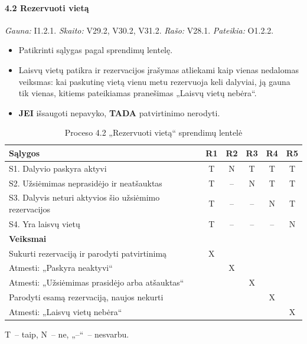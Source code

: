 \paragraph{4.2 Rezervuoti vietą}\mbox{}\par
{\small \textit{Gauna:} I1.2.1. \textit{Skaito:} V29.2, V30.2, V31.2. \textit{Rašo:} V28.1. \textit{Pateikia:} O1.2.2.}
\begin{itemize}
  \item Patikrinti sąlygas pagal sprendimų lentelę.
  \item Laisvų vietų patikra ir rezervacijos įrašymas atliekami kaip vienas nedalomas veiksmas: kai paskutinę vietą vienu metu rezervuoja keli dalyviai, ją gauna tik vienas, kitiems pateikiamas pranešimas „Laisvų vietų nebėra“.
  \item \textbf{JEI} išsaugoti nepavyko, \textbf{TADA} patvirtinimo nerodyti.
\end{itemize}
\begin{table}[H]
\centering
\caption{Proceso 4.2 „Rezervuoti vietą“ sprendimų lentelė}\label{tab:pspec-42}
\small
\begin{tabular}{@{}lccccc@{}}
\toprule
\textbf{Sąlygos} & \textbf{R1} & \textbf{R2} & \textbf{R3} & \textbf{R4} & \textbf{R5} \\
\midrule
S1. Dalyvio paskyra aktyvi & T & N & T & T & T \\
S2. Užsiėmimas neprasidėjo ir neatšauktas & T & -- & N & T & T \\
S3. Dalyvis neturi aktyvios šio užsiėmimo rezervacijos & T & -- & -- & N & T \\
S4. Yra laisvų vietų & T & -- & -- & -- & N \\
\midrule
\textbf{Veiksmai} & & & & & \\
Sukurti rezervaciją ir parodyti patvirtinimą & X & & & & \\
Atmesti: „Paskyra neaktyvi“ & & X & & & \\
Atmesti: „Užsiėmimas prasidėjo arba atšauktas“ & & & X & & \\
Parodyti esamą rezervaciją, naujos nekurti & & & & X & \\
Atmesti: „Laisvų vietų nebėra“ & & & & & X \\
\bottomrule
\end{tabular}

\smallskip
{\footnotesize T~– taip, N~– ne, „--“~– nesvarbu.}
\end{table}

